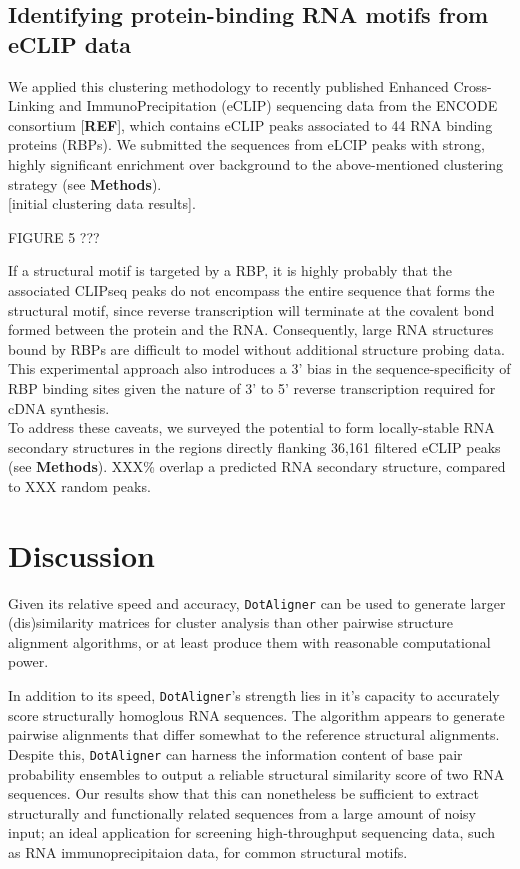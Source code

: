 \documentclass[a4paper,11pt]{article}
\newcommand\dotaligner{\texttt{DotAligner}}
\begin{document}
{\subsection*{ Identifying protein-binding RNA motifs from eCLIP data }
We applied this clustering methodology to recently published Enhanced Cross-Linking 
and ImmunoPrecipitation (eCLIP) sequencing data from the ENCODE consortium [\textbf{REF}], 
which contains eCLIP peaks associated to 44 RNA binding proteins (RBPs). We submitted the
sequences from eLCIP peaks with strong, highly significant enrichment over background 
to the above-mentioned clustering strategy (see \textbf{Methods}). \\

[initial clustering data results]. \\

\begin{center}
FIGURE 5 ??? 
\end{center}

If a structural motif is targeted by a RBP, it is highly probably that the associated CLIPseq peaks 
do not encompass the entire sequence that forms the structural motif, since 
reverse transcription will terminate at the covalent bond formed between the 
protein and the RNA. Consequently, large RNA structures bound by RBPs are 
difficult to model without additional structure probing data. This experimental 
approach also introduces a 3' bias in the sequence-specificity of RBP binding sites 
given the nature of 3' to 5' reverse transcription required for cDNA synthesis.\\

To address these caveats, we surveyed the potential to form locally-stable
RNA secondary structures in the regions directly flanking 36,161 filtered eCLIP 
peaks (see \textbf{Methods}). XXX\% overlap a predicted RNA secondary structure, 
compared to XXX random peaks. \\


\section*{Discussion}
Given its relative speed and accuracy, \dotaligner{} can be used to generate larger 
(dis)similarity matrices for cluster analysis than other pairwise structure 
alignment algorithms, or at least produce them with reasonable computational 
power.  

In addition to its speed, \dotaligner{}'s strength lies in it's capacity to accurately
score structurally homoglous RNA sequences. The algorithm appears to 
generate pairwise alignments that differ somewhat to the reference 
structural alignments. Despite this, \dotaligner{} can harness the information
content of base pair probability ensembles to output a reliable 
structural similarity score of two RNA sequences. Our results show that this
can nonetheless be sufficient to extract structurally and functionally related
sequences from a large amount of noisy input; an ideal application 
for screening high-throughput sequencing data, such as RNA 
immunoprecipitaion data, for common structural motifs. 

}
\end{document}
